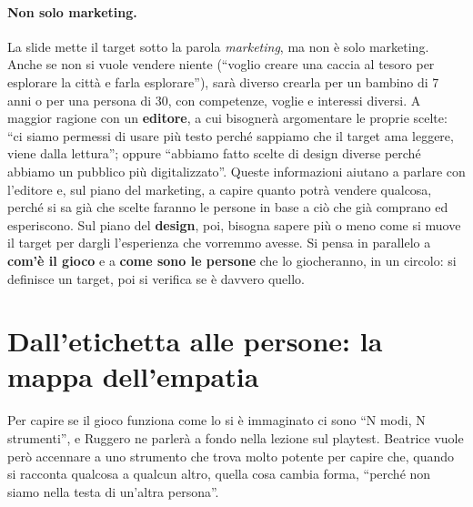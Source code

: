 \paragraph{Non solo marketing.} La slide mette il target sotto la parola
\emph{marketing}, ma non è solo marketing. Anche se non si vuole vendere niente (``voglio
creare una caccia al tesoro per esplorare la città e farla esplorare''), sarà diverso
crearla per un bambino di 7 anni o per una persona di 30, con competenze, voglie e
interessi diversi. A maggior ragione con un \textbf{editore}, a cui bisognerà
argomentare le proprie scelte: ``ci siamo permessi di usare più testo perché sappiamo
che il target ama leggere, viene dalla lettura''; oppure ``abbiamo fatto scelte di
design diverse perché abbiamo un pubblico più digitalizzato''. Queste informazioni
aiutano a parlare con l'editore e, sul piano del marketing, a capire quanto potrà
vendere qualcosa, perché si sa già che scelte faranno le persone in base a ciò che già
comprano ed esperiscono. Sul piano del \textbf{design}, poi, bisogna sapere più o
meno come si muove il target per dargli l'esperienza che vorremmo avesse. Si pensa in
parallelo a \textbf{com'è il gioco} e a \textbf{come sono le persone} che lo
giocheranno, in un circolo: si definisce un target, poi si verifica se è davvero
quello.

\section{Dall'etichetta alle persone: la mappa dell'empatia}
\label{a6:sec:empatia}



Per capire se il gioco funziona come lo si è immaginato ci sono ``N modi, N
strumenti'', e Ruggero ne parlerà a fondo nella lezione sul playtest. Beatrice vuole
però accennare a uno strumento che trova molto potente per capire che, quando si
racconta qualcosa a qualcun altro, quella cosa cambia forma, ``perché non siamo nella
testa di un'altra persona''.

